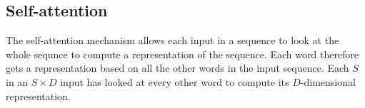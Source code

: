 \documentclass[11pt]{article}
\begin{document}
\subsection{Self-attention}

The self-attention mechanism allows each input in a sequence to look at the whole sequnce to compute a representation of the sequence. Each word therefore gets a representation based on all the other words in the input sequence. Each $S$ in an $S\times D$ input has looked at every other word to compute its $D$-dimensional representation.

\begin{minipage}[l]{.5\linewidth}
    \begin{figure}[H]
        \centering
    \end{figure}
\end{minipage}\hfill
\end{document}
